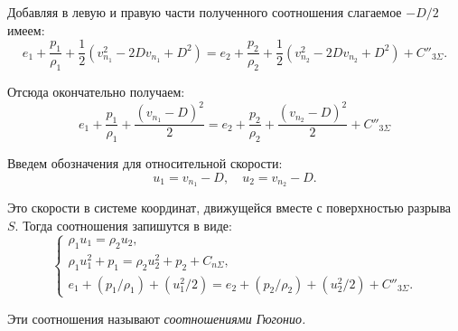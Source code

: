 Добавляя в левую и правую части полученного соотношения слагаемое $-D/2$ имеем:
\begin{equation*}
	e_1 + \frac{p_1}{\rho_1} + \frac{1}{2} \left(v^2_{n_1} - 2Dv_{n_1} + D^2\right) = e_2 + \frac{p_2}{\rho_2} + \frac{1}{2} \left(v_{n_2}^2 - 2 D v_{n_2} + D^2\right) + C''_{3\Sigma}.
\end{equation*}

Отсюда окончательно получаем:
\begin{equation*}
	e_1 + \frac{p_1}{\rho_1} + \frac{(v_{n_1} - D)^2}{2} = e_2 + \frac{p_2}{\rho_2} + \frac{(v_{n_2} - D)^2}{2} + C''_{3\Sigma}
\end{equation*}

Введем обозначения для относительной скорости:
\begin{equation*}
	u_1 = v_{n_1} - D, \quad u_2 = v_{n_2} - D.
\end{equation*}

Это скорости в системе координат, движущейся вместе с поверхностью разрыва $S$. Тогда соотношения запишутся в виде:
\begin{equation*}
	\begin{cases}
		\rho_1 u_1 = \rho_2 u_2, \\
		\rho_1 u^2_1 + p_1 = \rho_2 u^2_2 + p_2 + C_{n\Sigma}, \\
		e_1 + (p_1 / \rho_1) + (u_1^2 / 2) = e_2 + (p_2 / \rho_2) + (u^2_2 / 2) + C''_{3\Sigma}.
	\end{cases}
\end{equation*}

Эти соотношения называют \textit{соотношениями Гюгонио.}